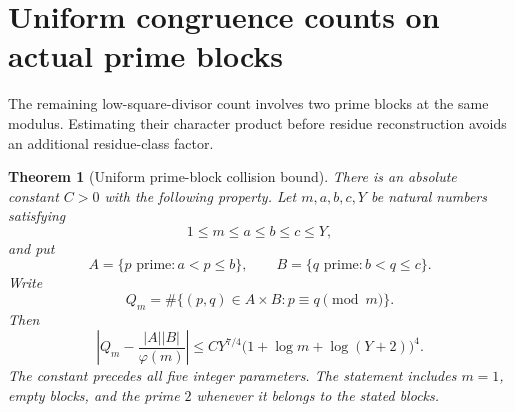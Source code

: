 \documentclass[11pt]{article}
\newtheorem{theorem}{Theorem}[section]
\begin{document}
\section{Uniform congruence counts on actual prime blocks}
\label{sec:uniform-prime-block-collisions}

The remaining low-square-divisor count involves two prime blocks
at the same modulus. Estimating their character product before
residue reconstruction avoids an additional residue-class factor.

\begin{theorem}[Uniform prime-block collision bound]
\label{thm:uniform-prime-block-collisions}
There is an absolute constant \(C>0\) with the following property.
Let \(m,a,b,c,Y\) be natural numbers satisfying
\[
 1\le m\le a\le b\le c\le Y,
\]
and put
\[
 A=\{p\text{ prime}:a<p\le b\},\qquad
 B=\{q\text{ prime}:b<q\le c\}.
\]
Write
\[
 Q_m=\#\{(p,q)\in A\times B:p\equiv q\pmod m\}.
\]
Then
\begin{equation}
 \left|Q_m-\frac{|A||B|}{\varphi(m)}\right|
 \le C Y^{7/4}
       \bigl(1+\log m+\log(Y+2)\bigr)^4.
 \label{eq:uniform-prime-block-collisions}
\end{equation}
The constant precedes all five integer parameters. The statement
includes \(m=1\), empty blocks, and the prime \(2\) whenever it
belongs to the stated blocks.
\end{theorem}
\end{document}
